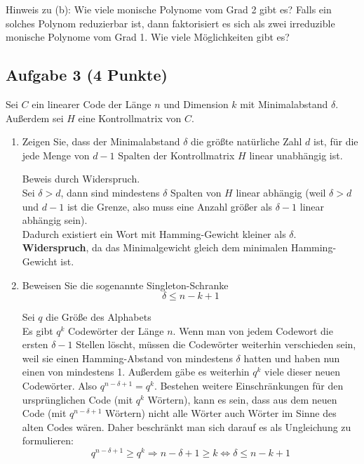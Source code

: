 \documentclass{article} %
\begin{document}
Hinweis zu (b): Wie viele monische Polynome vom Grad 2 gibt es? Falls ein solches
Polynom reduzierbar ist, dann faktorisiert es sich als zwei irreduzible monische Polynome
vom Grad 1. Wie viele Möglichkeiten gibt es?

\subsection*{Aufgabe 3 (4 Punkte)}
Sei \( C \) ein linearer Code der Länge \( n \) und Dimension \( k \) mit Minimalabstand \( \delta \). Außerdem
sei \( H \) eine Kontrollmatrix von \( C \).
\begin{enumerate}
    \item[(a)] Zeigen Sie, dass der Minimalabstand \( \delta \) die größte natürliche Zahl \( d \) ist, für die jede
    Menge von \( d - 1 \) Spalten der Kontrollmatrix \( H \) linear unabhängig ist.
    \begin{mybox}
      Beweis durch Widerspruch. \\
      Sei $\delta > d$, dann sind mindestens $\delta$ Spalten von $H$ linear abhängig (weil $\delta > d$ und $d-1$ ist die Grenze, also muss eine Anzahl größer als $\delta -1$ linear abhängig sein). \\
      Dadurch existiert ein Wort mit Hamming-Gewicht kleiner als $\delta$. \\
      \textbf{Widerspruch}, da das Minimalgewicht gleich dem minimalen Hamming-Gewicht ist. 
    \end{mybox}
    \item[(b)] Beweisen Sie die sogenannte Singleton-Schranke
    \[
    \delta \leq n - k + 1
    \]
    \begin{mybox}
    Sei $q$ die Größe des Alphabets\\ 
     Es gibt $q^k$ Codewörter der Länge $n$. Wenn man von jedem Codewort die ersten $\delta-1$ Stellen löscht, müssen die Codewörter weiterhin verschieden sein, weil sie einen Hamming-Abstand von mindestens $\delta$ hatten und haben nun einen von mindestens 1. Außerdem gäbe es weiterhin $q^k$ viele dieser neuen Codewörter. Also $q^{n-\delta +1} = q^k$. Bestehen weitere Einschränkungen für den ursprünglichen Code (mit $q^k$ Wörtern), kann es sein, dass aus dem neuen Code (mit $q^{n-\delta +1}$ Wörtern) nicht alle Wörter auch Wörter im Sinne des alten Codes wären. Daher beschränkt man sich darauf es als Ungleichung zu formulieren:
     \[
     q^{n-\delta +1} \geq q^k   \Rightarrow  n- \delta +1 \geq k  \Leftrightarrow \delta \leq n-k+1
     \]
    \end{mybox}
\end{enumerate}
\end{document}
